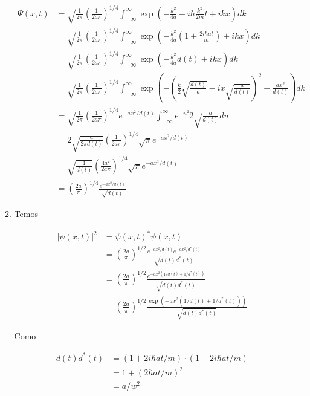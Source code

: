 \documentclass[a4paper, 12pt, notitlepage]{article}
\begin{document}
\begin{enumerate}
\begin{enumerate}
  \begin{align*}
  \Psi(x,t) &= \sqrt{\frac{1}{2\pi}} \left(\frac{1}{2a\pi}\right)^{1/4} \int_{-\infty}^{\infty} \exp\left(-\frac{k^2}{4a} - i\hbar \frac{k^2}{2m} t + ikx \right) dk \\
  &= \sqrt{\frac{1}{2\pi}} \left(\frac{1}{2a\pi}\right)^{1/4} \int_{-\infty}^{\infty} \exp\left(-\frac{k^2}{4a}\left(1 + \frac{2i\hbar at}{m}\right) + ikx \right) dk \\
  &= \sqrt{\frac{1}{2\pi}} \left(\frac{1}{2a\pi}\right)^{1/4} \int_{-\infty}^{\infty} \exp\left(-\frac{k^2}{4a} d(t) + ikx \right) dk \\
  &= \sqrt{\frac{1}{2\pi}} \left(\frac{1}{2a\pi}\right)^{1/4} \int_{-\infty}^{\infty} \exp\left( -\left(\frac{k}{2} \sqrt{\frac{d(t)}{a}}  - ix\sqrt{\frac{a}{d(t)}} \right)^2 - \frac{ax^2}{d(t)} \right)dk \\
  &= \sqrt{\frac{1}{2\pi}} \left(\frac{1}{2a\pi}\right)^{1/4} e^{-ax^2/d(t)} \int_{-\infty}^{\infty} e^{-u^2} 2\sqrt{\frac{a}{d(t)}}du \\
  &= 2\sqrt{\frac{a}{2\pi d(t)}} \left(\frac{1}{2a\pi}\right)^{1/4}\sqrt{\pi} e^{-ax^2/d(t)} \\
  &= \sqrt{\frac{1}{d(t)}} \left(\frac{4a^2}{2a\pi}\right)^{1/4}\sqrt{\pi} e^{-ax^2/d(t)} \\
  &= \left(\frac{2a}{\pi}\right)^{1/4} \frac{e^{-ax^2/d(t)}}{\sqrt{d(t)}}
  \end{align*}
  
  \item Temos

  \begin{align*}
  |\psi(x,t)|^2 &= \psi(x,t)^{\ast} \psi(x,t) \\
  &= \left(\frac{2a}{\pi}\right)^{1/2} \frac{e^{-ax^2/d(t)} e^{-ax^2/d^{\ast}(t)}}{\sqrt{d(t)d^{\ast}(t)}} \\
  &= \left(\frac{2a}{\pi}\right)^{1/2} \frac{e^{-ax^2\left(1/d(t) + 1/d^{\ast}(t)\right)}}{\sqrt{d(t)d^{\ast}(t)}} \\
  &= \left(\frac{2a}{\pi}\right)^{1/2} \frac{\exp\left(-ax^2\left(1/d(t) + 1/d^{\ast}(t)\right)\right)}{\sqrt{d(t)d^{\ast}(t)}}
  \end{align*}
  
  Como
  
  \begin{align*}
  d(t)d^{\ast}(t) &= \left(1 + 2i\hbar at/m \right)\cdot\left(1 - 2i\hbar at/m\right) \\
  &= 1 + \left(2\hbar at/m \right)^2 \\
  &= a/w^2
  \end{align*}
  

\end{enumerate}
\end{enumerate}
\end{document}
